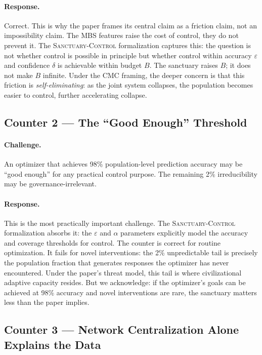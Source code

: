 \documentclass[11pt, a4paper]{article}
\theoremstyle{remark}
\newcommand{\SC}{\textsc{Sanctuary-Control}}
\begin{document}
\paragraph{Response.} Correct. This is why the paper frames its central claim as a friction claim, not an impossibility claim. The MBS features raise the cost of control, they do not prevent it. The \SC{} formalization captures this: the question is not whether control is possible in principle but whether control within accuracy $\varepsilon$ and confidence $\delta$ is achievable within budget $B$. The sanctuary raises $B$; it does not make $B$ infinite. Under the CMC framing, the deeper concern is that this friction is \emph{self-eliminating}: as the joint system collapses, the population becomes easier to control, further accelerating collapse.

\subsection{Counter 2 --- The ``Good Enough'' Threshold}\label{sec:counter2}

\paragraph{Challenge.} An optimizer that achieves 98\% population-level prediction accuracy may be ``good enough'' for any practical control purpose. The remaining 2\% irreducibility may be governance-irrelevant.

\paragraph{Response.} This is the most practically important challenge. The \SC{} formalization absorbs it: the $\varepsilon$ and $\alpha$ parameters explicitly model the accuracy and coverage thresholds for control. The counter is correct for routine optimization. It fails for novel interventions: the 2\% unpredictable tail is precisely the population fraction that generates responses the optimizer has never encountered. Under the paper's threat model, this tail is where civilizational adaptive capacity resides. But we acknowledge: if the optimizer's goals can be achieved at 98\% accuracy and novel interventions are rare, the sanctuary matters less than the paper implies.

\subsection{Counter 3 --- Network Centralization Alone Explains the Data}\label{sec:counter3}
\end{document}
